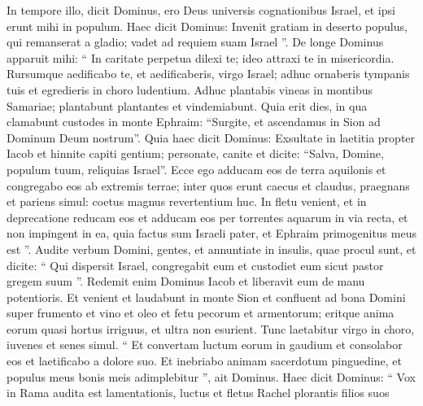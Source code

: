 \begin{biblechapter}
\begin{biblechapter}
\begin{biblechapter}
\begin{biblechapter}
\begin{biblechapter}
\begin{biblechapter}
\begin{biblechapter}
\begin{biblechapter}
\begin{biblechapter}
\begin{biblechapter}
\begin{biblechapter}
\begin{biblechapter}
\begin{biblechapter}
\begin{biblechapter}
\begin{biblechapter}
\begin{biblechapter}
\begin{biblechapter}
\begin{biblechapter}
\begin{biblechapter}
\begin{biblechapter}
\begin{biblechapter}
\begin{biblechapter}
\begin{biblechapter}
\begin{biblechapter}
\begin{biblechapter}
\begin{biblechapter}
\begin{biblechapter}
\begin{biblechapter}
\begin{biblechapter}
\begin{biblechapter}
\begin{biblechapter}
\verse In tempore illo,
 dicit Dominus,
 ero Deus universis cognationibus Israel,
 et ipsi erunt mihi in populum.
 \verse Haec dicit Dominus:
 Invenit gratiam in deserto
 populus, qui remanserat a gladio;
 vadet ad requiem suam Israel ”.
 \verse De longe Dominus apparuit mihi:
 “ In caritate perpetua dilexi te;
 ideo attraxi te in misericordia.
 \verse Rursumque aedificabo te, et aedificaberis,
 virgo Israel;
 adhuc ornaberis tympanis tuis
 et egredieris in choro ludentium.
 \verse Adhuc plantabis vineas in montibus Samariae;
 plantabunt plantantes
 et vindemiabunt.
 \verse Quia erit dies, in qua clamabunt custodes
 in monte Ephraim:
 “Surgite, et ascendamus in Sion
 ad Dominum Deum nostrum”.
 \verse Quia haec dicit Dominus:
 Exsultate in laetitia propter Iacob
 et hinnite capiti gentium;
 personate, canite et dicite:
 “Salva, Domine, populum tuum,
 reliquias Israel”.
 \verse Ecce ego adducam eos de terra aquilonis
 et congregabo eos ab extremis terrae;
 inter quos erunt caecus et claudus, praegnans et pariens simul:
 coetus magnus revertentium huc.
 \verse In fletu venient,
 et in deprecatione reducam eos
 et adducam eos per torrentes aquarum
 in via recta, et non impingent in ea, quia factus sum Israeli pater,
 et Ephraim primogenitus meus est ”.
 \verse Audite verbum Domini, gentes,
 et annuntiate in insulis, quae procul sunt, et dicite:
 “ Qui dispersit Israel, congregabit eum
 et custodiet eum sicut pastor gregem suum ”.
 \verse Redemit enim Dominus Iacob
 et liberavit eum de manu potentioris.
 \verse Et venient et laudabunt in monte Sion
 et confluent ad bona Domini
 super frumento et vino et oleo
 et fetu pecorum et armentorum;
 eritque anima eorum quasi hortus irriguus,
 et ultra non esurient.
 \verse Tunc laetabitur virgo in choro,
 iuvenes et senes simul.
 “ Et convertam luctum eorum in gaudium
 et consolabor eos et laetificabo a dolore suo.
 \verse Et inebriabo animam sacerdotum pinguedine,
 et populus meus bonis meis adimplebitur ”,
 ait Dominus.
 \verse Haec dicit Dominus:
 “ Vox in Rama audita est
 lamentationis, luctus et fletus
 Rachel plorantis filios suos

\end{biblechapter}
\end{biblechapter}
\end{biblechapter}
\end{biblechapter}
\end{biblechapter}
\end{biblechapter}
\end{biblechapter}
\end{biblechapter}
\end{biblechapter}
\end{biblechapter}
\end{biblechapter}
\end{biblechapter}
\end{biblechapter}
\end{biblechapter}
\end{biblechapter}
\end{biblechapter}
\end{biblechapter}
\end{biblechapter}
\end{biblechapter}
\end{biblechapter}
\end{biblechapter}
\end{biblechapter}
\end{biblechapter}
\end{biblechapter}
\end{biblechapter}
\end{biblechapter}
\end{biblechapter}
\end{biblechapter}
\end{biblechapter}
\end{biblechapter}
\end{biblechapter}
